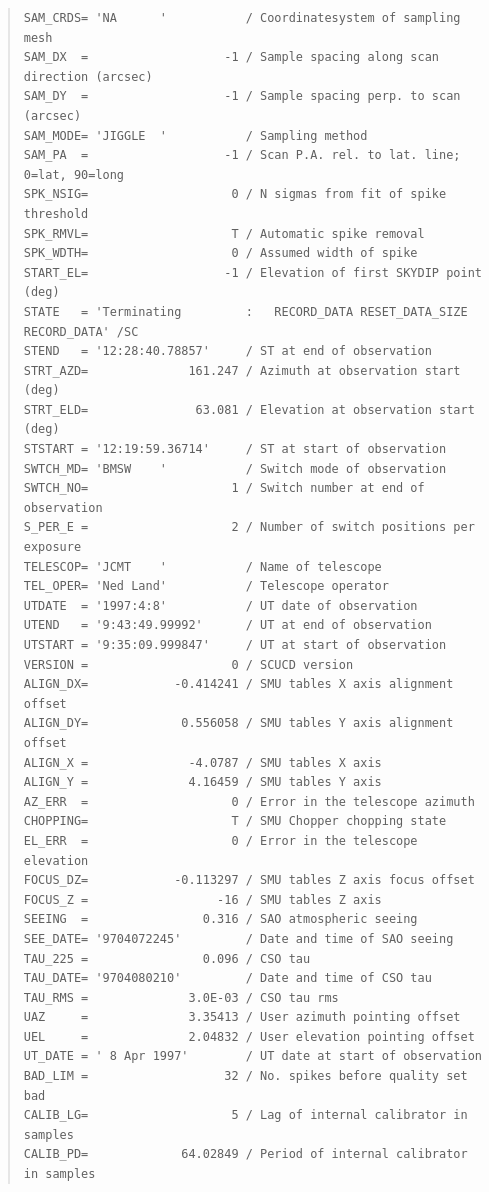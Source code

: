 \documentclass[twoside,11pt]{article}
\newenvironment{myquote}{\begin{quote}\begin{small}}{\end{small}\end{quote}}
\renewcommand{\_}{\texttt{\symbol{95}}}
\begin{document}
\begin{myquote}
\begin{verbatim}
SAM_CRDS= 'NA      '           / Coordinatesystem of sampling mesh
SAM_DX  =                   -1 / Sample spacing along scan direction (arcsec)
SAM_DY  =                   -1 / Sample spacing perp. to scan (arcsec)
SAM_MODE= 'JIGGLE  '           / Sampling method
SAM_PA  =                   -1 / Scan P.A. rel. to lat. line; 0=lat, 90=long
SPK_NSIG=                    0 / N sigmas from fit of spike threshold
SPK_RMVL=                    T / Automatic spike removal
SPK_WDTH=                    0 / Assumed width of spike
START_EL=                   -1 / Elevation of first SKYDIP point (deg)
STATE   = 'Terminating         :   RECORD_DATA RESET_DATA_SIZE RECORD_DATA' /SC
STEND   = '12:28:40.78857'     / ST at end of observation
STRT_AZD=              161.247 / Azimuth at observation start (deg)
STRT_ELD=               63.081 / Elevation at observation start (deg)
STSTART = '12:19:59.36714'     / ST at start of observation
SWTCH_MD= 'BMSW    '           / Switch mode of observation
SWTCH_NO=                    1 / Switch number at end of observation
S_PER_E =                    2 / Number of switch positions per exposure
TELESCOP= 'JCMT    '           / Name of telescope
TEL_OPER= 'Ned Land'           / Telescope operator
UTDATE  = '1997:4:8'           / UT date of observation
UTEND   = '9:43:49.99992'      / UT at end of observation
UTSTART = '9:35:09.999847'     / UT at start of observation
VERSION =                    0 / SCUCD version
ALIGN_DX=            -0.414241 / SMU tables X axis alignment offset
ALIGN_DY=             0.556058 / SMU tables Y axis alignment offset
ALIGN_X =              -4.0787 / SMU tables X axis
ALIGN_Y =              4.16459 / SMU tables Y axis
AZ_ERR  =                    0 / Error in the telescope azimuth
CHOPPING=                    T / SMU Chopper chopping state
EL_ERR  =                    0 / Error in the telescope elevation
FOCUS_DZ=            -0.113297 / SMU tables Z axis focus offset
FOCUS_Z =                  -16 / SMU tables Z axis
SEEING  =                0.316 / SAO atmospheric seeing
SEE_DATE= '9704072245'         / Date and time of SAO seeing
TAU_225 =                0.096 / CSO tau
TAU_DATE= '9704080210'         / Date and time of CSO tau
TAU_RMS =              3.0E-03 / CSO tau rms
UAZ     =              3.35413 / User azimuth pointing offset
UEL     =              2.04832 / User elevation pointing offset
UT_DATE = ' 8 Apr 1997'        / UT date at start of observation
BAD_LIM =                   32 / No. spikes before quality set bad
CALIB_LG=                    5 / Lag of internal calibrator in samples
CALIB_PD=             64.02849 / Period of internal calibrator in samples

\end{verbatim}
\end{myquote}
\end{document}
